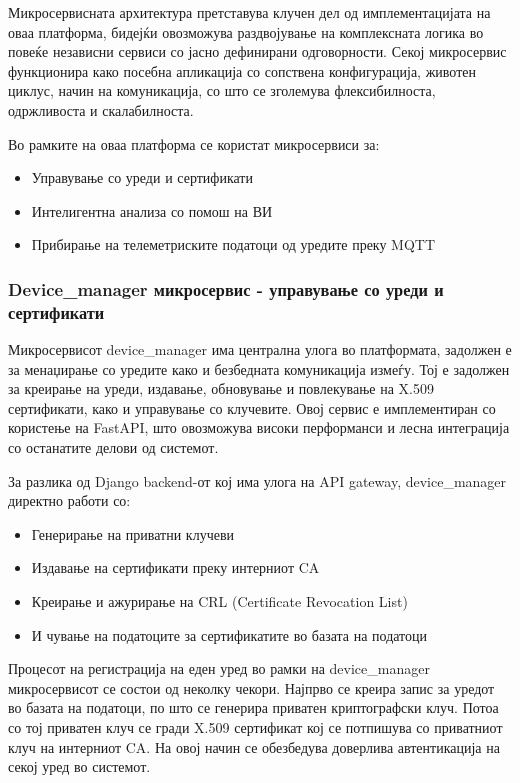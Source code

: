 Микросервисната архитектура претставува клучен дел од имплементацијата
на оваа платформа, бидејќи овозможува раздвојување на комплексната
логика во повеќе независни сервиси со јасно дефинирани одговорности.
Секој микросервис функционира како посебна апликација со сопствена
конфигурација, животен циклус, начин на комуникација, со што се
зголемува флексибилноста, одржливоста и скалабилноста.

Во рамките на оваа платформа се користат микросервиси за:

\begin{itemize}
\item
  Управување со уреди и сертификати
\item
  Интелигентна анализа со помош на ВИ
\item
  Прибирање на телеметриските податоци од уредите преку MQTT
\end{itemize}

\subsubsection{Device\_manager микросервис - управување со уреди и сертификати}

Микросервисот device\_manager има централна улога во платформата,
задолжен е за менаџирање со уредите како и безбедната комуникација
измеѓу. Тој е задолжен за креирање на уреди, издавање, обновување и
повлекување на X.509 сертификати, како и управување со клучевите. Овој
сервис е имплементиран со користење на FastAPI, што овозможува високи
перформанси и лесна интеграција со останатите делови од системот.

За разлика од Django backend-от кој има улога на API gateway,
device\_manager директно работи со:

\begin{itemize}
\item
  Генерирање на приватни клучеви
\item
  Издавање на сертификати преку интерниот CA
\item
  Креирање и ажурирање на CRL (Certificate Revocation List)
\item
  И чување на податоците за сертификатите во базата на податоци
\end{itemize}

Процесот на регистрација на еден уред во рамки на device\_manager
микросервисот се состои од неколку чекори. Најпрво се креира запис за
уредот во базата на податоци, по што се генерира приватен криптографски
клуч. Потоа со тој приватен клуч се гради X.509 сертификат кој се
потпишува со приватниот клуч на интерниот CA. На овој начин се
обезбедува доверлива автентикација на секој уред во системот.

